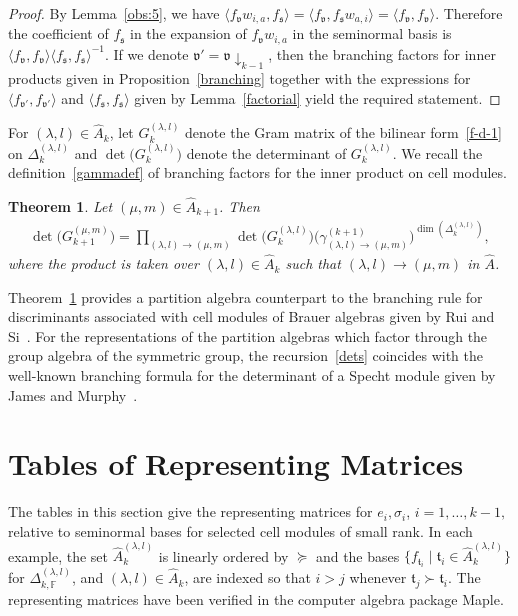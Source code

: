 \documentclass[11pt,a4paper,reqno,svgnames]{amsart}
\theoremstyle{plain}
\newtheorem{theorem}{Theorem}[section]
\theoremstyle{definition}
\numberwithin{equation}{section}
\begin{document}
\begin{proof}
By Lemma~\ref{obs:5}, we have $\langle f_\mathfrak{v}w_{i,a},f_\mathfrak{s}\rangle = \langle f_\mathfrak{v},f_\mathfrak{s}w_{a,i}\rangle= \langle f_\mathfrak{v},f_\mathfrak{v}\rangle$. Therefore the coefficient of $f_\mathfrak{s}$ in the expansion of $f_\mathfrak{v}w_{i,a}$ in the seminormal basis is $\langle f_\mathfrak{v},f_\mathfrak{v}\rangle \langle f_\mathfrak{s},f_\mathfrak{s}\rangle^{-1}$. If we denote $\mathfrak{v}'=\mathfrak{v}\downarrow_{k-1}$, then the branching factors for inner products given in Proposition~\ref{branching} together with the expressions for $\langle f_\mathfrak{v'},f_\mathfrak{v'}\rangle$ and $\langle f_\mathfrak{s},f_\mathfrak{s}\rangle$ given by Lemma~\ref{factorial} yield the required statement. 
\end{proof}
For $(\lambda,l)\in\hat{A}_{k}$, let $G^{(\lambda,l)}_k$ denote the Gram matrix of the bilinear form~\eqref{f-d-1} on $\Delta^{(\lambda,l)}_{k}$ and $\det\big(G^{(\lambda,l)}_k\big)$ denote the determinant of $G^{(\lambda,l)}_k$.  We recall the definition~\eqref{gammadef} of branching factors for the inner product on cell modules.
\begin{theorem}\label{detrecursion}
Let $(\mu,m)\in\hat{A}_{k+1}$. Then 
\begin{align}\label{dets}
\det \big(G_{k+1}^{(\mu,m)}\big)=\prod_{(\lambda,l)\to(\mu,m)}\det \big(G_{k}^{(\lambda,l)}\big)\big(\gamma_{(\lambda,l)\to(\mu,m)}^{(k+1)}\big)^{\dim(\Delta_{k}^{(\lambda,l)})},
\end{align}
where the product is taken over $(\lambda,l)\in\hat{A}_{k}$ such that $(\lambda,l)\to(\mu,m)$ in $\hat{A}$.
\end{theorem}
Theorem~\ref{detrecursion} provides a partition algebra counterpart to the branching rule for discriminants associated with cell modules of Brauer algebras given by Rui and Si~\cite[Theorem~4.11]{MR2369064}. For the representations of the partition algebras which factor through the group algebra of the symmetric group, the recursion~\eqref{dets} coincides with the well-known branching formula for the determinant of a Specht module given by James and Murphy~\cite[Sect.~2]{MR541676}.

\section{Tables of Representing Matrices}\label{stables}
The tables in this section give the representing matrices for ${e}_i,\sigma_{i}$, $i=1,\ldots,k-1,$ relative to seminormal bases for selected cell modules of small rank. In each example, the set $\hat{A}_k^{(\lambda,l)}$ is linearly ordered by $\succcurlyeq$ and the bases $\lbrace f_{\mathfrak{t}_i}\mid  \mathfrak{t}_i\in\hat{A}_k^{(\lambda,l)} \rbrace$  for $\Delta_{k,\mathbb{F}}^{(\lambda,l)}$, and $(\lambda,l)\in\hat{A}_k$, are indexed so that $i>j$ whenever $\mathfrak{t}_j\succ \mathfrak{t}_i$. The representing matrices have been verified in the computer algebra package Maple. 
\vfill
\end{document}
